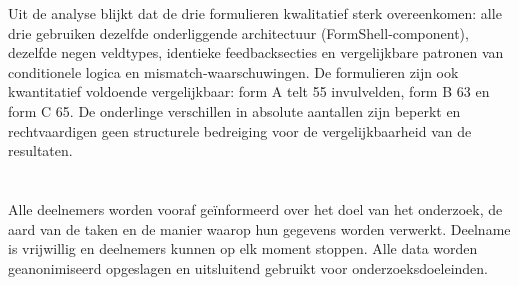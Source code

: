 Uit de analyse blijkt dat de drie formulieren kwalitatief sterk overeenkomen: alle drie gebruiken dezelfde onderliggende architectuur (FormShell‑component), dezelfde negen veldtypes, identieke feedbacksecties en vergelijkbare patronen van conditionele logica en mismatch-waarschuwingen. De formulieren zijn ook kwantitatief voldoende vergelijkbaar: form A telt 55 invulvelden, form B 63 en form C 65. De onderlinge verschillen in absolute aantallen zijn beperkt en rechtvaardigen geen structurele bedreiging voor de vergelijkbaarheid van de resultaten.

\section{}
Alle deelnemers worden vooraf geïnformeerd over het doel van het onderzoek, de aard van de taken en de manier waarop hun gegevens worden verwerkt. Deelname is vrijwillig en deelnemers kunnen op elk moment stoppen. Alle data worden geanonimiseerd opgeslagen en uitsluitend gebruikt voor onderzoeksdoeleinden.



